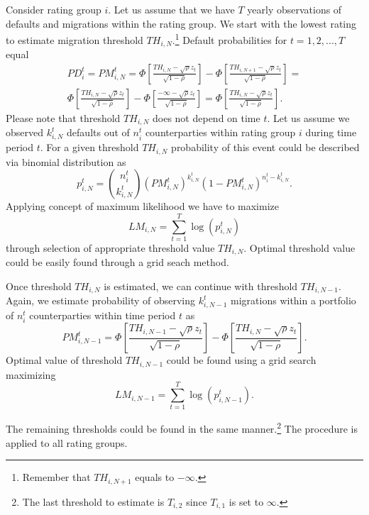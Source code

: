 \documentclass[a4paper]{article}
\begin{document}
Consider rating group $i$. Let us assume that we have $T$ yearly observations 
of defaults and migrations within the rating group. We start with the lowest 
rating to estimate migration threshold $TH_{i, N}$.\footnote{Remember that $TH_{i, N + 1}$ equals to $-\infty$.} Default probabilities for $t = 
1, 2, ..., T$ equal
\begin{multline}
PD_i^t = PM_{i,N}^t = \Phi\left[\frac{TH_{i, N} - \sqrt{\rho}z_t}{\sqrt{1 - 
\rho}}\right] - \Phi\left[\frac{TH_{i, N + 1} - \sqrt{\rho}z_t}{\sqrt{1 - 
\rho}}\right] =\\
\Phi\left[\frac{TH_{i, N} - \sqrt{\rho}z_t}{\sqrt{1 - 
\rho}}\right] - \Phi\left[\frac{-\infty - \sqrt{\rho}z_t}{\sqrt{1 - 
\rho}}\right] = \Phi\left[\frac{TH_{i, N} - \sqrt{\rho}z_t}{\sqrt{1 - 
\rho}}\right].
\end{multline}
Please note that threshold $TH_{i, N}$ does not depend on time $t$. Let us 
assume we observed $k_{i,N}^t$ defaults out of $n_i^t$ counterparties 
within rating group $i$ during time period $t$. For a given threshold $TH_{i, N}$ 
probability of this event could be described via binomial distribution as
\begin{equation}
p_{i, N}^t = \binom{n_i^t}{k_{i, N}^t} \left(PM_{i,N}^t\right)^{k_{i, 
N}^t} \left(1 - PM_{i,N}^t\right)^{n_i^t - k_{i, N}^t}.
\end{equation}
Applying concept of maximum likelihood we have to maximize
\begin{equation}
LM_{i, N} = \sum_{t = 1}^T \log(p_{i, N}^t)
\end{equation}
through selection of appropriate threshold value $TH_{i, N}$. Optimal threshold value could be easily found through a grid seach method.

Once threshold $TH_{i, N}$ is estimated, we can continue with threshold 
$TH_{i, N - 1}$. Again, we estimate probability of observing $k_{i, N 
- 1}^t$ migrations within a portfolio of $n_i^t$ counterparties within time period $t$ as
\begin{equation}
PM_{i,N - 1}^t = \Phi\left[\frac{TH_{i, N - 1} - \sqrt{\rho}z_t}{\sqrt{1 - 
\rho}}\right] - \Phi\left[\frac{TH_{i, N} - \sqrt{\rho}z_t}{\sqrt{1 - 
\rho}}\right].
\end{equation}
Optimal value of threshold $TH_{i, N - 1}$ could be found using a grid 
search maximizing
\begin{equation}
LM_{i, N - 1} = \sum_{t = 1}^T \log(p_{i, N - 1}^t).
\end{equation}

The remaining thresholds could be found in the same manner.\footnote{The last threshold to estimate is $T_{i, 2}$ since $T_{i, 1}$ is set to $\infty$.} The
procedure is applied to all rating groups.
\end{document}
